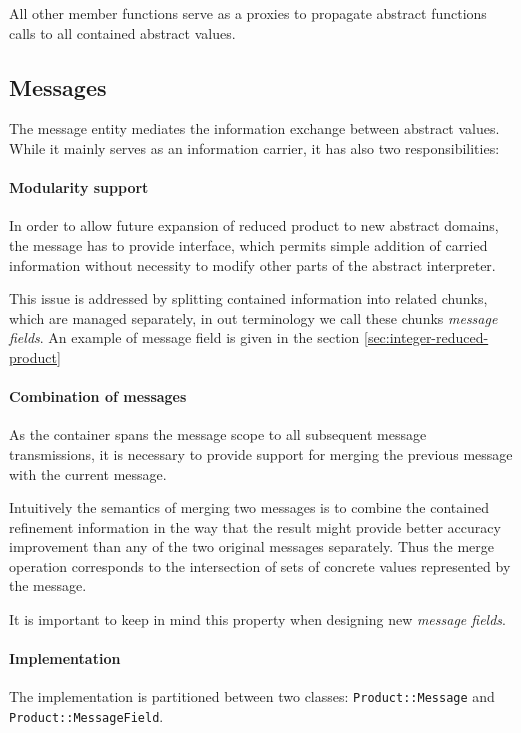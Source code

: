 \documentclass[12pt,oneside]{fithesis2}
\theoremstyle{definition}
\begin{document}
All other member functions serve as a proxies to propagate abstract functions calls to all contained abstract values.

\subsection{Messages}

The message entity mediates the information exchange between abstract values. While it mainly serves as an information carrier, it has also two responsibilities:

\paragraph{Modularity support}
In order to allow future expansion of reduced product to new abstract domains, the message has to provide interface, which permits simple addition of carried information without necessity to modify other parts of the abstract interpreter.

This issue is addressed by splitting contained information into related chunks, which are managed separately, in out terminology we call these chunks \textit{message fields}. An example of message field is given in the section \ref{sec:integer-reduced-product}

\paragraph{Combination of messages}
As the container spans the message scope to all subsequent message transmissions, it is necessary to provide support for merging the previous message with the current message.

Intuitively the semantics of merging two messages is to combine the contained refinement information in the way that the result might provide better accuracy improvement than any of the two original messages separately. Thus the merge operation corresponds to the intersection of sets of concrete values represented by the message.

It is important to keep in mind this property when designing new \textit{message fields}.

\paragraph{Implementation}
The implementation is partitioned between two classes: \texttt{Product::Message} and \texttt{Product::MessageField}.
\end{document}
